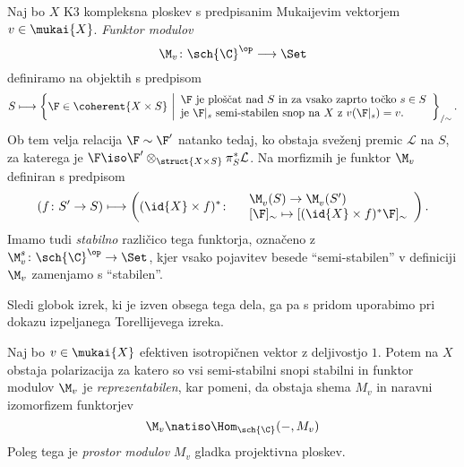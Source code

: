 \begin{definicija}
    Naj bo $X$ K3 kompleksna ploskev s predpisanim Mukaijevim vektorjem $v \in \mukai{X}$. \emph{Funktor modulov} 
    \[
        \M_v \colon \sch{\C}^\op \longrightarrow \Set
    \]
    definiramo na objektih s predpisom
    \[
        S \longmapsto \left\{\F \in \coherent{X \times S} \ \middle| 
        \begin{array}{l}
            \text{$\F$ je ploščat nad $S$ in za vsako zaprto točko $s \in S$} \\
            \text{je $\F|_s$ semi-stabilen snop na $X$ z $v(\F|_s) = v$.}
        \end{array}
        \right\}_{/\sim}.
    \]
    Ob tem velja relacija $\F \sim \F'$ natanko tedaj, ko obstaja sveženj premic $\mathcal L$ na $S$, za katerega je $\F \iso \F' \otimes_{\struct{X \times S}} \pi_S^*\mathcal L$. Na morfizmih je funktor $\M_v$ definiran s predpisom
    \[
        (f\colon S' \to S) \longmapsto \left( (\id{X} \times f)^* \colon
            \begin{array}{r l}
                & \M^{}_v(S) \to \M^{}_v(S') \\
                & [\F]_\sim \mapsto [(\id{X} \times f)^*\F]_\sim
            \end{array}
            \right).
    \]
    Imamo tudi \emph{stabilno} različico tega funktorja, označeno z $\M_v^{s} \colon \sch{\C}^\op \to \Set$, kjer vsako pojavitev besede ``semi-stabilen'' v definiciji $\M_v$ zamenjamo s ``stabilen''.
\end{definicija}

Sledi globok izrek, ki je izven obsega tega dela, ga pa s pridom uporabimo pri dokazu izpeljanega Torellijevega izreka. 

\begin{izrek}
    \textsl{\cite{GottscheHuybrechts1996,huybrechts2006fouriermukai, OGrady1997,HuybrechtsLehn2010,BayerMacri2014}}
    Naj bo $v \in \mukai{X}$ efektiven isotropičnen vektor z deljivostjo $1$. Potem na $X$ obstaja polarizacija za katero so vsi semi-stabilni snopi stabilni in funktor modulov $\M_v$ je \emph{reprezentabilen}, kar pomeni, da obstaja shema $M_v$ in naravni izomorfizem funktorjev 
    \[
        \M_v \natiso \Hom_{\sch{\C}}(-, M_v)
    \]
    Poleg tega je \emph{prostor modulov} $M_v$ gladka projektivna ploskev. 
\end{izrek}

